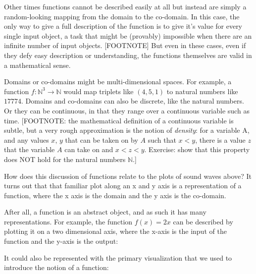 \documentclass[UTF8]{book}
\begin{document}
\begin{CJK}{UTF8}{gbsn}
Other times functions cannot be described easily at all but instead are simply a random-looking mapping from the domain to the co-domain. In this case, the only way to give a full description of the function is to give it's value for every single input object, a task that might be (provably) impossible when there are an infinite number of input objects. [FOOTNOTE] But even in these cases, even if they defy easy description or understanding, the functions themselves are valid in a mathematical sense.

Domains or co-domains might be multi-dimensional spaces. For example, a function $f: \mathbb{N}^{3} \rightarrow \mathbb{N}$ would map triplets like $(4,5,1)$ to natural numbers like $17774$. Domains and co-domains can also be discrete, like the natural numbers. Or they can be continuous, in that they range over a continuous variable such as time. [FOOTNOTE: the mathematical definition of a continuous variable is subtle, but a very rough approximation is the notion of \emph{density}: for a variable A, and any values $x$, $y$ that can be taken on by $A$ such that $x < y$, there is a value $z$ that the variable $A$ can take on and $x < z < y$. Exercise: show that this property does NOT hold for the natural numbers $\mathbb{N}$.]

How does this discussion of functions relate to the plots of sound waves above? It turns out that that familiar plot along an x and y axis is a representation of a function, where the x axis is the domain and the y axis is the co-domain.

After all, a function is an abstract object, and as such it has many representations. For example, the function $f(x)=2x$ can be described by plotting it on a two dimensional axis, where the x-axis is the input of the function and the y-axis is the output:


It could also be represented with the primary visualization that we used to introduce the notion of a function:


\end{CJK}
\end{document}
